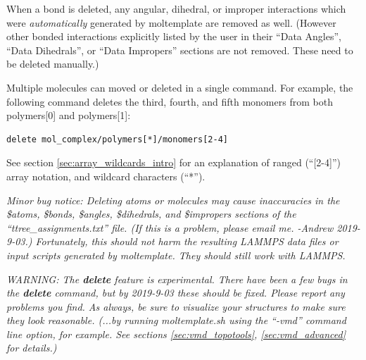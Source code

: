 \documentclass[11pt]{article}
\begin{document}
When a bond is deleted, any angular, dihedral, or improper 
interactions which were \textit{automatically} 
generated by moltemplate are removed as well.
(However other bonded interactions explicitly listed by the user in their
``Data Angles'', ``Data Dihedrals'', or ``Data Impropers'' sections
are not removed.  These need to be deleted manually.)

Multiple molecules can moved or deleted in a single command.  For example,
the following command deletes the third, fourth, and fifth monomers from 
both polymers[0] and polymers[1]:
\begin{verbatim}
delete mol_complex/polymers[*]/monomers[2-4]
\end{verbatim}
See section \ref{sec:array_wildcards_intro} for an
explanation of ranged (``[2-4]'') array notation, 
and wildcard characters (``*'').



\textit{Minor bug notice: 
Deleting atoms or molecules may cause 
inaccuracies in the \$atoms, \$bonds, \$angles, \$dihedrals, and \$impropers
sections of the ``ttree\_assignments.txt'' file.
(If this is a problem, please email me. -Andrew 2019-9-03.)
Fortunately, this should not harm the resulting LAMMPS data files or input
scripts generated by moltemplate.  They should still work with LAMMPS.}

\textit{WARNING: The \textbf{delete} feature is experimental.
There have been a few bugs in the \textbf{delete} command, but by 2019-9-03
these should be fixed.  Please report any problems you find.
As always, be sure to visualize your structures 
to make sure they look reasonable.
(...by running moltemplate.sh using the 
 ``-vmd'' command line option, for example.
 See sections \ref{sec:vmd_topotools}, \ref{sec:vmd_advanced} for details.)}





\end{document}
